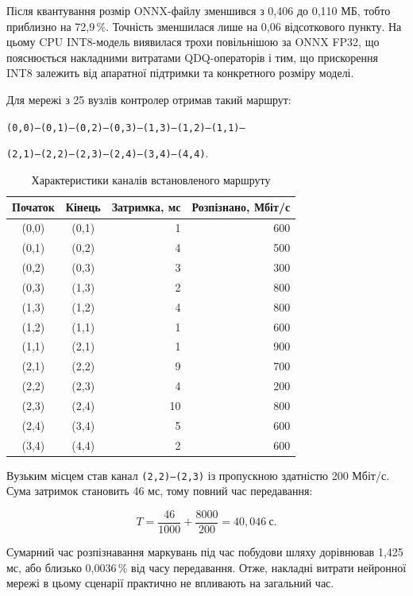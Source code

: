 \documentclass[12pt,a4paper]{article}
\begin{document}
Після квантування розмір ONNX-файлу зменшився з 0,406 до 0,110 МБ, тобто
приблизно на 72,9\,\%. Точність зменшилася лише на 0,06 відсоткового пункту.
На цьому CPU INT8-модель виявилася трохи повільнішою за ONNX FP32, що
пояснюється накладними витратами QDQ-операторів і тим, що прискорення INT8
залежить від апаратної підтримки та конкретного розміру моделі.

Для мережі з 25 вузлів контролер отримав такий маршрут:

\begin{center}
\small
\texttt{(0,0)--(0,1)--(0,2)--(0,3)--(1,3)--(1,2)--(1,1)--}\par
\texttt{(2,1)--(2,2)--(2,3)--(2,4)--(3,4)--(4,4)}.
\end{center}

\begin{table}[H]
\centering
\scriptsize
\begin{tabular}{c c r r}
\toprule
\textbf{Початок} & \textbf{Кінець} & \textbf{Затримка, мс} & \textbf{Розпізнано, Мбіт/с}\\
\midrule
(0,0) & (0,1) & 1  & 600\\
(0,1) & (0,2) & 4  & 500\\
(0,2) & (0,3) & 3  & 300\\
(0,3) & (1,3) & 2  & 800\\
(1,3) & (1,2) & 4  & 800\\
(1,2) & (1,1) & 1  & 600\\
(1,1) & (2,1) & 1  & 900\\
(2,1) & (2,2) & 9  & 700\\
(2,2) & (2,3) & 4  & 200\\
(2,3) & (2,4) & 10 & 800\\
(2,4) & (3,4) & 5  & 600\\
(3,4) & (4,4) & 2  & 600\\
\bottomrule
\end{tabular}
\caption{Характеристики каналів встановленого маршруту}
\end{table}

Вузьким місцем став канал \texttt{(2,2)--(2,3)} із пропускною здатністю
200 Мбіт/с. Сума затримок становить 46 мс, тому повний час передавання:

\begin{equation}
  T=\frac{46}{1000}+\frac{8000}{200}=40{,}046\ \text{с}.
\end{equation}

Сумарний час розпізнавання маркувань під час побудови шляху дорівнював
1,425 мс, або близько 0,0036\,\% від часу передавання. Отже, накладні витрати
нейронної мережі в цьому сценарії практично не впливають на загальний час.
\end{document}

